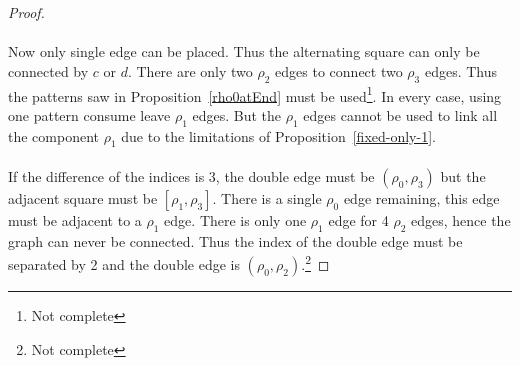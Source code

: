 \begin{proof}
  \begin{figure}[H]
    \begin{center}
      \caption{}
    \end{center}
  \end{figure}

  \paragraph{}
  Now only single edge can be placed. Thus the alternating square can only be connected by $c$ or $d$. There are only two $\rho_2$ edges to connect two $\rho_3$ edges. Thus the patterns saw in Proposition~\ref{rho0atEnd} must be used\footnote{Not complete}. In every case, using one pattern consume leave $\rho_1$ edges. But the $\rho_1$ edges cannot be used to link all the component $\rho_1$ due to the limitations of Proposition~\ref{fixed-only-1}.

  \paragraph{}
  If the difference of the indices is 3, the double edge must be $(\rho_0, \rho_3)$ but the adjacent square must be $[\rho_1, \rho_3]$. There is a single $\rho_0$ edge remaining, this edge must be adjacent to a $\rho_1$ edge. There is only one $\rho_1$ edge for 4 $\rho_2$ edges, hence the graph can never be connected. Thus the index of the double edge must be separated by 2 and the double edge is $(\rho_0, \rho_2)$.\footnote{Not complete}


\end{proof}
